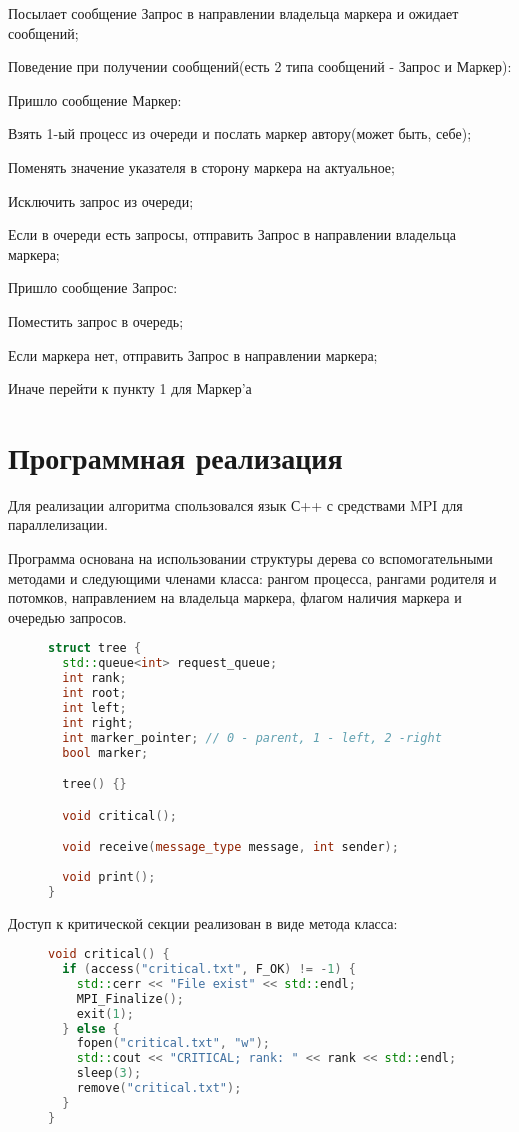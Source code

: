 \documentclass[12pt, oneside, a4paper]{article}
\begin{document}
Посылает сообщение Запрос в направлении владельца маркера и ожидает сообщений;

Поведение при получении сообщений(есть 2 типа сообщений - Запрос и Маркер):

Пришло сообщение Маркер:

Взять 1-ый процесс из очереди и послать маркер автору(может быть, себе);

Поменять значение указателя в сторону маркера на актуальное;

Исключить запрос из очереди;

Если в очереди есть запросы, отправить Запрос в направлении владельца маркера;

Пришло сообщение Запрос:

Поместить запрос в очередь;

Если маркера нет, отправить Запрос в направлении маркера;

Иначе перейти к пункту 1 для Маркер'а

\section{Программная реализация}

Для реализации алгоритма спользовался язык С++ с средствами MPI для параллелизации.

Программа основана на использовании структуры дерева со вспомогательными методами и следующими членами класса: рангом процесса, рангами родителя и потомков, направлением на владельца маркера, флагом наличия маркера и очередью запросов.

\begin{figure}[h]
\begin{lstlisting}[language=C++]
struct tree {
  std::queue<int> request_queue;
  int rank;
  int root;
  int left;
  int right;
  int marker_pointer; // 0 - parent, 1 - left, 2 -right
  bool marker;

  tree() {}

  void critical();

  void receive(message_type message, int sender);
  
  void print();
}
\end{lstlisting}
\end{figure}

Доступ к критической секции реализован в виде метода класса:

\begin{figure}[h]
\begin{lstlisting}[language=C++]
void critical() {
  if (access("critical.txt", F_OK) != -1) {
    std::cerr << "File exist" << std::endl;
    MPI_Finalize();
    exit(1);
  } else {
    fopen("critical.txt", "w");
    std::cout << "CRITICAL; rank: " << rank << std::endl;
    sleep(3);
    remove("critical.txt");
  }
}
\end{lstlisting}
\end{figure}
\end{document}
